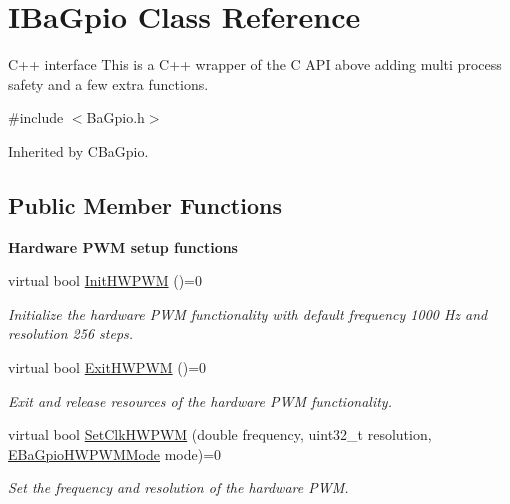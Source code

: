 \hypertarget{classIBaGpio}{}\section{I\+Ba\+Gpio Class Reference}
\label{classIBaGpio}


C++ interface This is a C++ wrapper of the C A\+P\+I above adding multi process safety and a few extra functions.  




{\ttfamily \#include $<$Ba\+Gpio.\+h$>$}



Inherited by C\+Ba\+Gpio.

\subsection*{Public Member Functions}
\begin{Indent}{\bf Hardware P\+W\+M setup functions}\par
\begin{DoxyCompactItemize}
\item 
virtual bool \hyperlink{classIBaGpio_af8f837eef2a5db810723753d2ddfec0b}{Init\+H\+W\+P\+W\+M} ()=0
\begin{DoxyCompactList}\small\item\em Initialize the hardware P\+W\+M functionality with default frequency 1000 Hz and resolution 256 steps. \end{DoxyCompactList}\item 
virtual bool \hyperlink{classIBaGpio_a0a1ef586b8d8786802b4535709dfd288}{Exit\+H\+W\+P\+W\+M} ()=0
\begin{DoxyCompactList}\small\item\em Exit and release resources of the hardware P\+W\+M functionality. \end{DoxyCompactList}\item 
virtual bool \hyperlink{classIBaGpio_a598f466d00fe7f82b620e1b22afbd599}{Set\+Clk\+H\+W\+P\+W\+M} (double frequency, uint32\+\_\+t resolution, \hyperlink{BaGpio_8h_a63be35fa967e6932fc65444ce4a97f1f}{E\+Ba\+Gpio\+H\+W\+P\+W\+M\+Mode} mode)=0
\begin{DoxyCompactList}\small\item\em Set the frequency and resolution of the hardware P\+W\+M. \end{DoxyCompactList}\end{DoxyCompactItemize}
\end{Indent}
